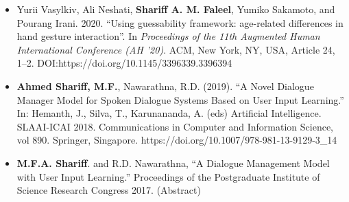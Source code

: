 \documentclass[a4paper,9.5pt]{article}
\begin{document}
\begin{itemize}
  \item[]Yurii Vasylkiv, Ali Neshati, \textbf{Shariff A. M. Faleel}, Yumiko Sakamoto, and Pourang Irani. 2020. ``Using guessability framework: age-related differences in hand gesture interaction''. In \textit{Proceedings of the 11th Augmented Human International Conference (AH '20)}. ACM, New York, NY, USA, Article 24, 1–2. DOI:https://doi.org/10.1145/3396339.3396394
  \item[]\textbf{Ahmed Shariff, M.F.}, Nawarathna, R.D. (2019). ``A Novel Dialogue Manager Model for Spoken Dialogue Systems Based on User Input Learning.'' In: Hemanth, J., Silva, T., Karunananda, A. (eds) Artificial Intelligence. SLAAI-ICAI 2018. Communications in Computer and Information Science, vol 890. Springer, Singapore. https://doi.org/10.1007/978-981-13-9129-3\_14
  \item[]\textbf{M.F.A. Shariff}. and R.D. Nawarathna, ``A Dialogue Management Model with User Input Learning.'' Proceedings of the Postgraduate Institute of Science Research Congress 2017. (Abstract)
\end{itemize}


\end{document}
